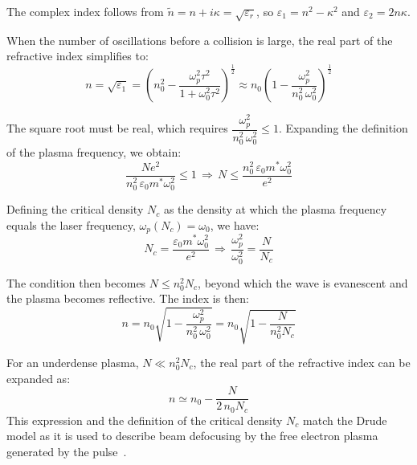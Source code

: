 The complex index follows from $\tilde{n} = n + i\kappa = \sqrt{\varepsilon_r}$, so $\varepsilon_1 = n^2 - \kappa^2$ and $\varepsilon_2 = 2n\kappa$.

When the number of oscillations before a collision is large, the real part of the refractive index simplifies to:
\begin{equation}
  n = \sqrt{\varepsilon_1} = \left(n_0^2 - \frac{\omega_p^2\tau^2}{1 + \omega_0^2\tau^2}\right)^\frac{1}{2} \approx n_0\left(1 - \frac{\omega_p^2}{n_0^2\,\omega_0^2}\right)^\frac{1}{2}
\end{equation}

The square root must be real, which requires $\dfrac{\omega_p^2}{n_0^2\,\omega_0^2} \leq 1$. Expanding the definition of the plasma frequency, we obtain:
\begin{equation}
  \frac{Ne^2}{n_0^2\,\varepsilon_0 m^\ast \omega_0^2} \leq 1
  \,\Longrightarrow\,
  N \leq \frac{n_0^2\,\varepsilon_0 m^\ast \omega_0^2}{e^2}
\end{equation}

Defining the critical density $N_c$ as the density at which the plasma frequency equals the laser frequency, $\omega_p(N_c) = \omega_0$, we have:
\begin{equation}
  N_c = \frac{\varepsilon_0 m^\ast \omega_0^2}{e^2}
  \,\Longrightarrow\,
  \frac{\omega_p^2}{\omega_0^2} = \frac{N}{N_c}
\end{equation}

The condition then becomes $N \leq n_0^2 N_c$, beyond which the wave is evanescent and the plasma becomes reflective. The index is then:
\begin{equation}
  n = n_0\sqrt{1 - \frac{\omega_p^2}{n_0^2\,\omega_0^2}} = n_0\sqrt{1 - \frac{N}{n_0^2 N_c}}
\end{equation}

For an underdense plasma, $N \ll n_0^2 N_c$, the real part of the refractive index can be expanded as:
\begin{equation}
  n \simeq n_0 - \frac{N}{2\,n_0 N_c}
  \label{eq:delta_n_plasma}
\end{equation}
This expression and the definition of the critical density $N_c$ match the Drude model as it is used to describe beam defocusing by the free electron plasma generated by the pulse~\cite{mao2004}.
